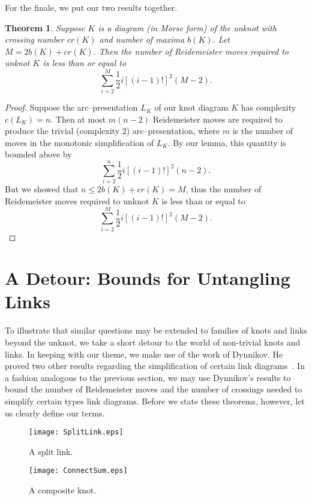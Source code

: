 \documentclass{amsart}
\newtheorem{theorem}{Theorem}
\begin{document}
For the finale, we put our two results together.

\begin{theorem}
Suppose $K$ is a diagram (in Morse form) of the unknot with crossing number $cr(K)$ and number of maxima $b(K)$. Let $M=2b(K)+cr(K)$. Then the number of Reidemeister moves required to unknot $K$ is less than or equal to $$\sum_{i=2}^M\frac{1}{2}i[(i-1)!]^2(M-2).$$
\end{theorem}

\begin{proof}
Suppose the arc--presentation $L_K$ of our knot diagram $K$ has complexity $c(L_K)=n$. Then at most $m (n-2)$ Reidemeister moves are required to produce the trivial (complexity 2) arc--presentation, where $m$ is the number of moves in the monotonic simplification of $L_K$. By our lemma, this quantity is bounded above by $$\sum_{i=2}^n\frac{1}{2}i[(i-1)!]^2(n-2).$$ But we showed that $n\leq 2b(K)+cr(K)=M$, thus the number of Reidemeister moves required to unknot $K$ is less than or equal to $$\sum_{i=2}^M\frac{1}{2}i[(i-1)!]^2(M-2).$$
\end{proof}


\section{A Detour: Bounds for Untangling Links}\label{links}

To illustrate that similar questions may be extended to families of knots and links beyond the unknot, we take a short detour to the world of non-trivial knots and links. In keeping with our theme, we make use of the work of Dynnikov. He proved two other results regarding the simplification of certain link diagrams~\cite{dynnikov}. In a fashion analogous to the previous section, we may use Dynnikov's results to bound the number of Reidemeister moves and the number of crossings needed to simplify certain types link diagrams. Before we state these theorems, however, let us clearly define our terms. 

\begin{figure}[h]
\begin{center}
\texttt{[image: SplitLink.eps]}
\end{center}
\caption{ \small{A split link.}}\label{split}
\end{figure}

\begin{figure}[h]
\begin{center}
\texttt{[image: ConnectSum.eps]}
\end{center}
\caption{ \small{A composite knot.}}\label{composite}
\end{figure}
\end{document}
